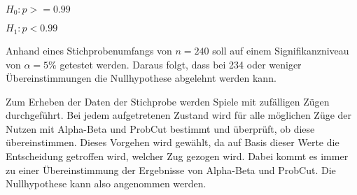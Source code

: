 \hspace*{1.3cm}
$H_0:p>=0.99$

\hspace*{1.3cm}
$H_1:p<0.99$

Anhand eines Stichprobenumfangs von $n=240$ soll auf einem Signifikanzniveau von $\alpha=5\%$ getestet werden. Daraus
folgt, dass bei 234 oder weniger Übereinstimmungen die Nullhypothese abgelehnt werden kann.

Zum Erheben der Daten der Stichprobe werden Spiele mit zufälligen Zügen durchgeführt. Bei jedem aufgetretenen Zustand
wird für alle möglichen Züge der Nutzen mit Alpha-Beta und ProbCut bestimmt und überprüft, ob diese übereinstimmen.
Dieses Vorgehen wird gewählt, da auf Basis dieser Werte die Entscheidung getroffen wird, welcher Zug gezogen wird.
Dabei kommt es immer zu einer Übereinstimmung der Ergebnisse von Alpha-Beta und ProbCut. Die Nullhypothese kann also
angenommen werden.
